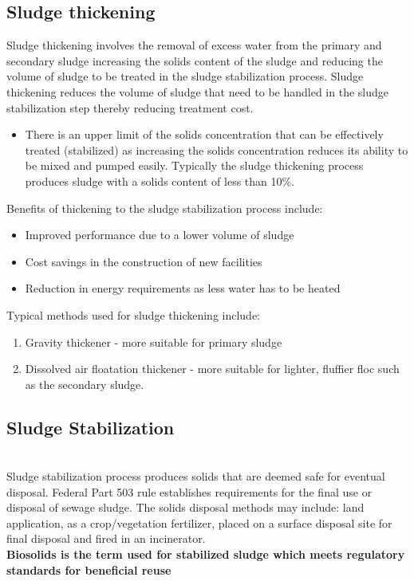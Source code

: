 \subsection{Sludge thickening}
Sludge thickening involves the removal of excess water from the primary and secondary sludge increasing the solids content of the sludge and reducing the volume of sludge to be treated in the sludge stabilization process.
Sludge thickening reduces the volume of sludge that need to be handled in the sludge stabilization step thereby reducing treatment cost.  
\begin{itemize}
\item There is an upper limit of the solids concentration that can be effectively treated (stabilized) as increasing the solids concentration reduces its ability to be mixed and pumped easily.  Typically the sludge thickening process produces sludge with a solids content of less than 10\%.\\
\end{itemize}
Benefits of thickening to the sludge stabilization process include:
\begin{itemize}
\item Improved performance due to a lower volume of sludge
\item Cost savings in the construction of new facilities
\item Reduction in energy requirements as less water has to be heated
\end{itemize}
Typical methods used for sludge thickening include:
\begin{enumerate}
\item Gravity thickener - more suitable for primary sludge
\item Dissolved air floatation thickener - more suitable for lighter, fluffier floc such as the secondary sludge.
\end{enumerate}
\subsection{Sludge Stabilization}
\textbf{}\\
Sludge stabilization process produces solids that are deemed safe for eventual disposal.  Federal Part 503 rule establishes requirements for the final use or disposal of sewage sludge.  The solids disposal methods may include: land application, as a crop/vegetation fertilizer, placed on a surface disposal site for final disposal and fired in an incinerator.\\
\textbf{Biosolids is the term used for stabilized sludge which meets regulatory standards for beneficial reuse}\\  

